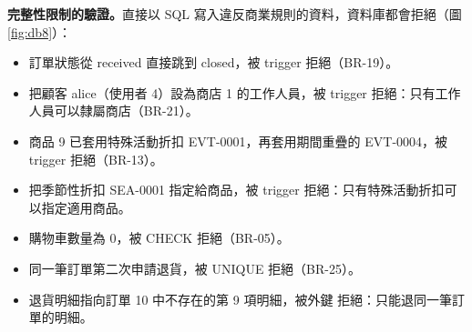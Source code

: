 \textbf{完整性限制的驗證。}直接以 SQL 寫入違反商業規則的資料，資料庫都會拒絕（圖 \ref{fig:db8}）：
\begin{itemize}[itemsep=0.1em]
  \item 訂單狀態從 received 直接跳到 closed，被 trigger 拒絕（BR-19）。
  \item 把顧客 alice（使用者 4）設為商店 1 的工作人員，被 trigger  拒絕：只有工作人員可以隸屬商店（BR-21）。
  \item 商品 9 已套用特殊活動折扣 EVT-0001，再套用期間重疊的 EVT-0004，被 trigger 拒絕（BR-13）。
  \item 把季節性折扣 SEA-0001 指定給商品，被 trigger 拒絕：只有特殊活動折扣可以指定適用商品。
  \item 購物車數量為 0，被 CHECK 拒絕（BR-05）。
  \item 同一筆訂單第二次申請退貨，被 UNIQUE 拒絕（BR-25）。
  \item 退貨明細指向訂單 10 中不存在的第 9 項明細，被外鍵  拒絕：只能退同一筆訂單的明細。
\end{itemize}

